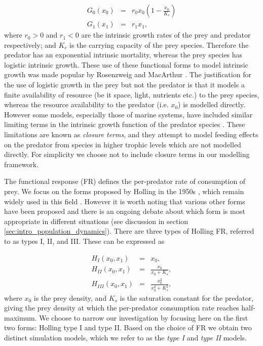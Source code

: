 
\begin{eqnarray}
G_0(x_0) &=& r_0x_0\left(1-\frac{x_0}{K_c}\right)  \\[10pt]
G_1(x_1) &=& r_1x_1,
\label{eq:intrinsic_growth}
\end{eqnarray}
%
where $r_0 > 0$ and $r_1 < 0$ are the intrinsic growth rates of the prey and predator respectively; and $K_c$ is the carrying capacity of the prey species. Therefore the predator has an exponential intrinsic mortality, whereas the prey species has logistic intrinsic growth. These use of these functional forms to model intrinsic growth was made popular by Rosenzweig and MacArthur \cite{rosenzweig1963graphical}. The justification for the use of logistic growth in the prey but not the predator is that it models a finite availability of resource (be it space, light, nutrients etc.) to the prey species, whereas the resource availability to the predator (i.e. $x_0$) is modelled directly. However some models, especially those of marine systems, have included similar limiting terms in the intrinsic growth function of the predator species \cite{mitra2009closure}. These limitations are known as \emph{closure terms}, and they attempt to model feeding effects on the predator from species in higher trophic levels which are not modelled directly. For simplicity we choose not to include closure terms in our modelling framework. 

The functional response (FR) defines the per-predator rate of consumption of prey. We focus on the forms proposed by Holling in the 1950s \cite{holling1959some}, which remain widely used in this field \cite{hastings2013population}. However it is worth noting that various other forms have been proposed and there is an ongoing debate about which form is most appropriate in different situations \cite{barraquand2014functional,jost2000identifying} (see discussion in section \ref{sec:intro_population_dynamics}). There are three types of Holling FR, referred to as types I, II, and III. These can be expressed as

\begin{eqnarray}
H_I(x_0,x_1) &=& x_0,  \label{eq:h1} \\[10pt]
H_{II}(x_0,x_1) &=& \frac{x_0}{x_0 + K_s},  \label{eq:h2} \\[10pt]
H_{III}(x_0,x_1) &=& \frac{x_0^2}{x_0^2 + K_s^2},
\end{eqnarray}
%
where $x_0$ is the prey density, and $K_s$ is the saturation constant for the predator, giving the prey density at which the per-predator consumption rate reaches half-maximum. We choose to narrow our investigation by focusing here on the first two forms: Holling type I and type II. Based on the choice of FR we obtain two distinct simulation models, which we refer to as the \emph{type I} and \emph{type II} models.

